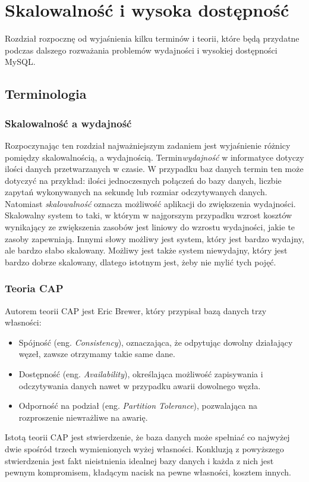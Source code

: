 \section{Skalowalność i wysoka dostępność}
Rozdział rozpocznę od wyjaśnienia kilku terminów i teorii, które będą przydatne podczas dalszego rozważania problemów wydajności i wysokiej dostępności MySQL.


\subsection{Terminologia}
\subsubsection{Skalowalność a wydajność}
Rozpoczynając ten rozdział najważniejszym zadaniem jest wyjaśnienie różnicy pomiędzy skalowalnością, a wydajnością. Termin\textit{wydajność} w informatyce dotyczy ilości danych przetwarzanych w czasie. W przypadku baz danych termin ten może dotyczyć na przykład: ilości jednoczesnych połączeń do bazy danych, liczbie zapytań wykonywanych na sekundę lub rozmiar odczytywanych danych. Natomiast \textit{skalowalność} oznacza możliwość aplikacji do zwiększenia wydajności. Skalowalny system to taki, w którym w najgorszym przypadku wzrost kosztów wynikający ze zwiększenia zasobów jest liniowy do wzrostu wydajności, jakie te zasoby zapewniają. Innymi słowy możliwy jest system, który jest bardzo wydajny, ale bardzo słabo skalowany. Możliwy jest także system niewydajny, który jest bardzo dobrze skalowany, dlatego istotnym jest, żeby nie mylić tych pojęć.


\subsubsection{Teoria CAP}
Autorem teorii CAP jest Eric Brewer, który przypisał bazą danych trzy własności:
\begin{itemize}
	\item Spójność (eng. \textit{Consistency}), oznaczająca, że odpytując dowolny działający węzeł, zawsze otrzymamy takie same dane.
	\item Dostępność (eng. \textit{Availability}), określająca możliwość zapisywania i odczytywania danych nawet w przypadku awarii dowolnego węzła.
	\item Odporność na podział (eng. \textit{Partition Tolerance}), pozwalająca na rozproszenie niewrażliwe na awarię.
\end{itemize}
Istotą teorii CAP jest stwierdzenie, że baza danych może spełniać co najwyżej dwie spośród trzech wymienionych wyżej własności. Konkluzją z powyższego stwierdzenia jest fakt nieistnienia idealnej bazy danych i każda z nich jest pewnym kompromisem, kładącym nacisk na pewne własności, kosztem innych.

